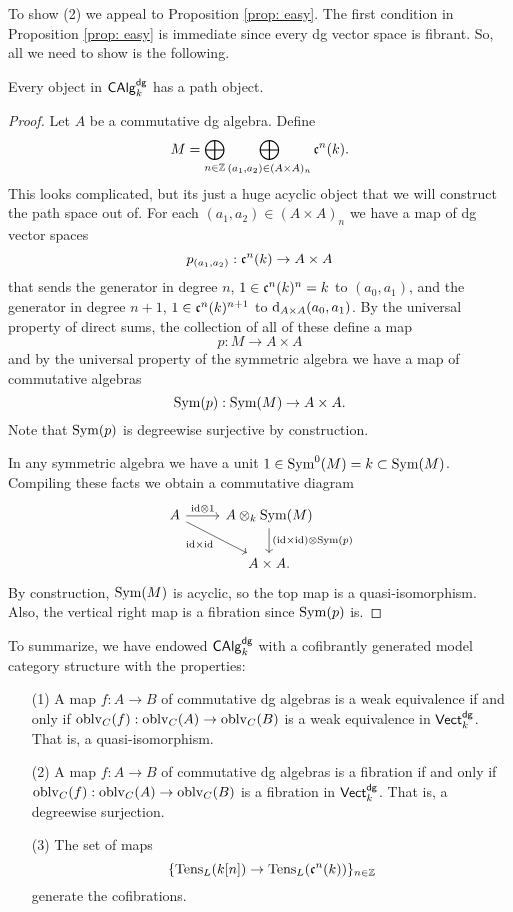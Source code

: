 \documentclass[11pt]{amsart}
\begin{document}
To show (2) we appeal to Proposition \ref{prop: easy}. 
The first condition in Proposition \ref{prop: easy} is immediate since every dg vector space is fibrant. 
So, all we need to show is the following. 

\begin{lem}
Every object in ${\sf CAlg}^{\sf dg}_k$ has a path object.
\end{lem}
\begin{proof}
Let $A$ be a commutative dg algebra. 
Define
\[
M = \bigoplus_{n \in \mathbb Z} \bigoplus_{(a_1,a_2) \in (A \times A)_n} \mathfrak c^n(k) .
\]
This looks complicated, but its just a huge acyclic object that we will construct the path space out of. 
For each $(a_1,a_2) \in (A \times A)_n$ we have a map of dg vector spaces
\[
p_{(a_1,a_2)} : \mathfrak c^n(k) \to A \times A
\]
that sends the generator in degree $n$, $1 \in \mathfrak c^n(k)^n = k$ to $(a_0,a_1)$, and the generator in degree $n+1$, $1 \in \mathfrak c^n(k)^{n+1}$ to ${\rm d}_{A \times A} (a_0, a_1)$. 
By the universal property of direct sums, the collection of all of these define a map
\[
p : M \to A \times A
\]
and by the universal property of the symmetric algebra we have a map of commutative algebras
\[
{\rm Sym}(p) : {\rm Sym}(M) \to A \times A .
\]
Note that ${\rm Sym}(p)$ is degreewise surjective by construction. 

In any symmetric algebra we have a unit $1 \in {\rm Sym}^0(M) = k \subset {\rm Sym}(M)$. 
Compiling these facts we obtain a commutative diagram
\[
\begin{tikzcd}
A \ar[r, "\id \tensor 1"] \ar[dr, "\id \times \id"'] & A \tensor_k \Sym(M) \ar[d, "(\id \times \id) \tensor \Sym(p)"] \\
& A \times A .
\end{tikzcd}
\]
By construction, ${\rm Sym}(M)$ is acyclic, so the top map is a quasi-isomorphism. 
Also, the vertical right map is a fibration since ${\rm Sym}(p)$ is. 
\end{proof}

To summarize, we have endowed ${\sf CAlg}^{\sf dg}_k$ with a cofibrantly generated model category structure with the properties:
\begin{itemize}
\item[(1)] A map $f : A \to B$ of commutative dg algebras is a weak equivalence if and only if ${\rm oblv}_C(f) : {\rm oblv}_C(A) \to {\rm oblv}_C(B)$ is a weak equivalence in ${\sf Vect}^{\sf dg}_k$.
That is, a quasi-isomorphism. 
\item[(2)] A map $f : A \to B$ of commutative dg algebras is a fibration if and only if ${\rm oblv}_C(f) : {\rm oblv}_C(A) \to {\rm oblv}_C(B)$ is a fibration in ${\sf Vect}^{\sf dg}_k$.
That is, a degreewise surjection. 
\item[(3)] The set of maps
\[
\{{\rm Tens}_L(k[n]) \to {\rm Tens}_L (\mathfrak c^n(k))\}_{n \in \mathbb Z}
\]
generate the cofibrations. 
\end{itemize}
\end{document}
